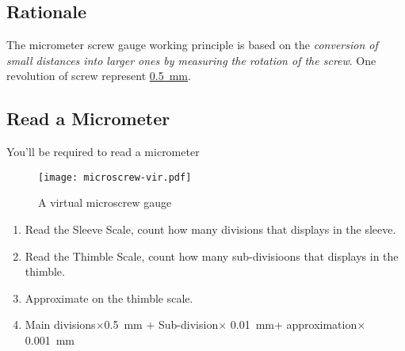 \documentclass[a4paper]{tufte-handout}
\begin{document}
\subsection{Rationale}
The micrometer screw gauge working principle is based on the \emph{conversion of small distances into larger ones by measuring the rotation of the screw}. One revolution of screw represent \uline{\SI{0.5}{\mm}}.

\subsection{Read a Micrometer}
You'll be required to read a micrometer
\begin{figure*}[h]
\texttt{[image: microscrew-vir.pdf]}
\caption{A virtual microscrew gauge}
\end{figure*}

\begin{enumerate}
  \item Read the Sleeve Scale, count how many divisions that displays in the sleeve.
  \item Read the Thimble Scale, count how many sub-divisioons that displays in the thimble.
  \item Approximate on the thimble scale.
  \item Main divisions$\times$\SI{0.5}{\mm} $+$ Sub-division$\times$ \SI{0.01}{\mm}+ approximation$\times$\SI{0.001}{\mm}
\end{enumerate}
\end{document}
